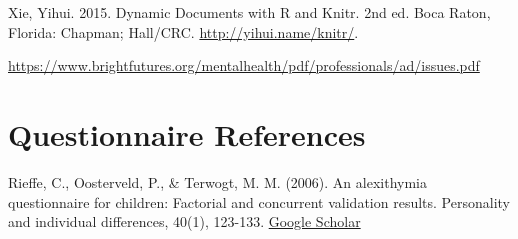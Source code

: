 \documentclass[]{book}
\begin{document}
Xie, Yihui. 2015. Dynamic Documents with R and Knitr. 2nd ed. Boca Raton, Florida: Chapman; Hall/CRC. \url{http://yihui.name/knitr/}.

\url{https://www.brightfutures.org/mentalhealth/pdf/professionals/ad/issues.pdf}

\hypertarget{questionnaire-references}{%
\section{Questionnaire References}\label{questionnaire-references}}

Rieffe, C., Oosterveld, P., \& Terwogt, M. M. (2006). An alexithymia questionnaire for children: Factorial and concurrent validation results. Personality and individual differences, 40(1), 123-133. \href{https://www.sciencedirect.com/science/article/abs/pii/S019188690500231X}{Google Scholar}


\end{document}
